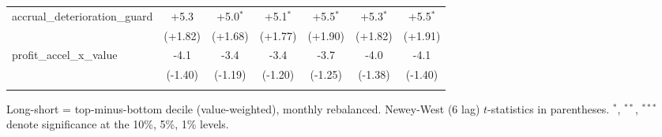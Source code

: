 \begin{table}[htbp]
\begin{threeparttable}
\begin{tabular}{lcccccc}
\addlinespace
accrual\_deterioration\_guard & +5.3 & +5.0$^{*}$ & +5.1$^{*}$ & +5.5$^{*}$ & +5.3$^{*}$ & +5.5$^{*}$ \\
 & (+1.82) & (+1.68) & (+1.77) & (+1.90) & (+1.82) & (+1.91) \\
\addlinespace
profit\_accel\_x\_value & -4.1 & -3.4 & -3.4 & -3.7 & -4.0 & -4.1 \\
 & (-1.40) & (-1.19) & (-1.20) & (-1.25) & (-1.38) & (-1.40) \\
\addlinespace
\bottomrule
\end{tabular}
\begin{tablenotes}\footnotesize
\item Long-short = top-minus-bottom decile (value-weighted), monthly rebalanced. Newey-West (6 lag) $t$-statistics in parentheses. $^{*}$, $^{**}$, $^{***}$ denote significance at the 10\%, 5\%, 1\% levels.
\end{tablenotes}
\end{threeparttable}
\end{table}